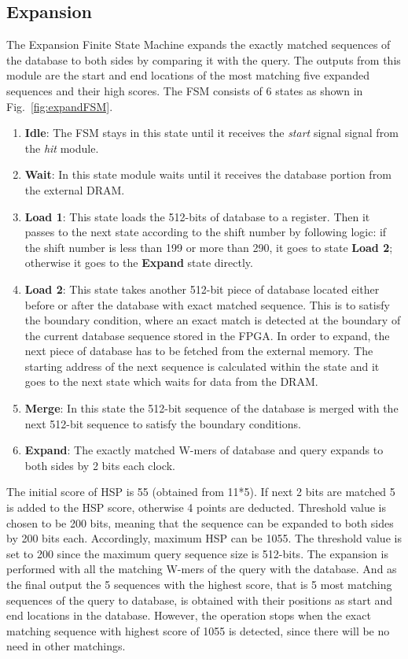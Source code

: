 \subsection{Expansion}
The Expansion Finite State Machine expands the exactly matched sequences of the database to both sides by comparing it with the query. 
The outputs from this module are the start and end locations of the most matching five expanded sequences and their high scores. The FSM consists of 6 states as shown in Fig.~\ref{fig:expandFSM}.

\begin{enumerate}
  \item \textbf{Idle}: The FSM stays in this state until it receives the \textit{start} signal signal from the \textit{hit} module.
  \item \textbf{Wait}: In this state module waits until it receives the database portion from the external DRAM.
  \item \textbf{Load 1}: This state loads the 512-bits of database to a register. Then it passes to the next state according to the shift number by following logic: if the shift number is less than 199 or more than 290, it goes to state \textbf{Load 2}; otherwise it goes to the \textbf{Expand} state directly. 
  \item \textbf{Load 2}: This state takes another 512-bit piece of database located either before or after the database with exact matched sequence. This is to satisfy the boundary condition, where an exact match is detected at the boundary of the current database sequence stored in the FPGA. In order to expand, the next piece of database has to be fetched from the external memory. 
The starting address of the next sequence is calculated within the state and it goes to the next state which waits for data from the DRAM. 
  \item \textbf{Merge}: In this state the 512-bit sequence of the database is merged with the next 512-bit sequence to satisfy the boundary conditions.
  \item \textbf{Expand}: The exactly matched W-mers of database and query expands to both sides by 2 bits each clock.
\end{enumerate}

The initial score of HSP is 55 (obtained from 11*5). 
If next 2 bits are matched 5 is added to the HSP score, otherwise 4 points are deducted. 
Threshold value is chosen to be 200 bits, meaning that the sequence can be expanded to both sides by 200 bits each. 
Accordingly, maximum HSP can be 1055. 
The threshold value is set to 200 since the maximum query sequence size is 512-bits.
The expansion is performed with all the matching W-mers of the query with the database. And as the final output the 5 sequences with the highest score, that is 5 most matching sequences of the query to database, is obtained with their positions as start and end locations in the database. However, the operation stops when the exact matching sequence with highest score of 1055 is detected, since there will be no need in other matchings.
       

